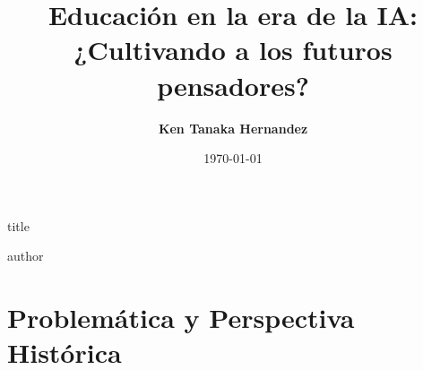 \documentclass[aspectratio=169,11pt]{beamer}
\title{\huge\textbf{Educación en la era de la
IA:}\\[0.2em]\LARGE¿Cultivando a los futuros pensadores?}
\author{\textbf{Ken Tanaka Hernandez}}
\institute{Universit\`{a} degli Studi di Trieste \textbar\ OGS}
\date{\today}
\begin{document}
\begin{frame}[plain]
  \vspace{1.0cm}
  \begin{beamercolorbox}[sep=8pt,left,wd=\textwidth]{title}
    \inserttitle\par
  \end{beamercolorbox}
  \vspace{0.6cm}
  \begin{beamercolorbox}[sep=8pt,left,wd=\textwidth]{author}
    \insertauthor\par
    \vspace{0.15cm}
    \small\color{textMuted}\insertinstitute\par
    \vspace{0.15cm}
    \footnotesize\color{textMuted}\insertdate
  \end{beamercolorbox}
\end{frame}

\section{Problemática y Perspectiva Histórica}
\end{document}
